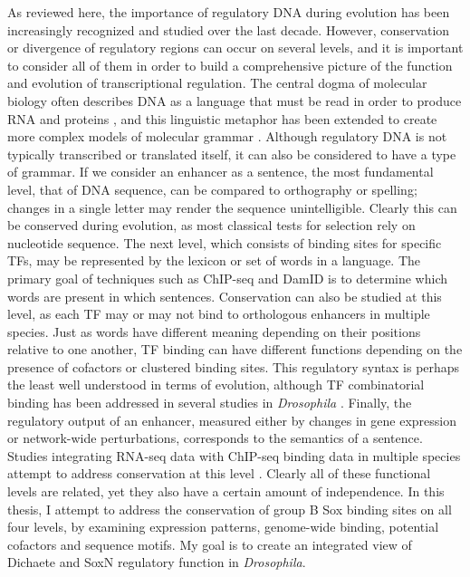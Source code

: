 As reviewed here, the importance of regulatory DNA during evolution has been increasingly recognized and studied over the last decade. However, conservation or divergence of regulatory regions can occur on several levels, and it is important to consider all of them in order to build a comprehensive picture of the function and evolution of transcriptional regulation. The central dogma of molecular biology often describes DNA as a language that must be read in order to produce RNA and proteins \citep{gerstein_what_2007}, and this linguistic metaphor has been extended to create more complex models of molecular grammar \citep{searls_linguistic_1997,searls_reading_2001,searls_language_2002}. Although regulatory DNA is not typically transcribed or translated itself, it can also be considered to have a type of grammar. If we consider an enhancer as a sentence, the most fundamental level, that of DNA sequence, can be compared to orthography or spelling; changes in a single letter may render the sequence unintelligible. Clearly this can be conserved during evolution, as most classical tests for selection rely on nucleotide sequence. The next level, which consists of binding sites for specific TFs, may be represented by the lexicon or set of words in a language. The primary goal of techniques such as ChIP-seq and DamID is to determine which words are present in which sentences. Conservation can also be studied at this level, as each TF may or may not bind to orthologous enhancers in multiple species. Just as words have different meaning depending on their positions relative to one another, TF binding can have different functions depending on the presence of cofactors or clustered binding sites. This regulatory syntax is perhaps the least well understood in terms of evolution, although TF combinatorial binding has been addressed in several studies in \emph{Drosophila} \citep{he_high_2011,zinzen_combinatorial_2009}. Finally, the regulatory output of an enhancer, measured either by changes in gene expression or network-wide perturbations, corresponds to the semantics of a sentence. Studies integrating RNA-seq data with ChIP-seq binding data in multiple species attempt to address conservation at this level \citep{paris_extensive_2013}. Clearly all of these functional levels are related, yet they also have a certain amount of independence. In this thesis, I attempt to address the conservation of group B Sox binding sites on all four levels, by examining expression patterns, genome-wide binding, potential cofactors and sequence motifs. My goal is to create an integrated view of Dichaete and SoxN regulatory function in \emph{Drosophila}. 
